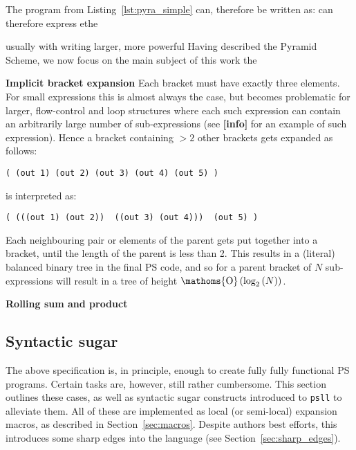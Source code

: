 \documentclass[aip,jcp,reprint,footinbib]{revtex4-1}
\DeclareMathOperator{\bigO}{\ensuremath{\mathoms{O}}}
\newcommand\plinfo{{\color[rgb]{0.929,0.694,0.125}\textbf{[info]}}\xspace}
\newcommand\psll{\texttt{psll}\xspace}
\begin{document}
The program from Listing~\ref{lst:pyra_simple} can, therefore be written as:
can therefore express ethe 

usually with writing larger, more powerful
Having described the Pyramid Scheme, we now focus on the main subject of this work the 




\textbf{Implicit bracket expansion} Each bracket must have exactly three elements. For small expressions this is almost always the case, but becomes problematic for larger, flow-control and loop structures where each such expression can contain an arbitrarily large number of sub-expressions (see \plinfo for an example of such expression). Hence a bracket containing $>2$ other brackets gets expanded as follows:
\begin{lstlisting}[language=psll,aboveskip=3pt,belowskip=-2pt,frame=none,numbers=none]
( (out 1) (out 2) (out 3) (out 4) (out 5) )
\end{lstlisting}
is interpreted as:
\begin{lstlisting}[language=psll,aboveskip=3pt,belowskip=-2pt,frame=none,numbers=none]
( (((out 1) (out 2))  ((out 3) (out 4)))  (out 5) )
\end{lstlisting}
Each neighbouring pair or elements of the parent gets put together into a bracket, until the length of the parent is less than 2. This results in a (literal) balanced binary tree in the final PS code, and so for a parent bracket of $N$ sub-expressions will result in a tree of height $\bigO\left(\log_2\left(N\right)\right)$.

\textbf{Rolling sum and product}





\subsection{Syntactic sugar}\label{sec:sugar}
The above specification is, in principle, enough to create fully fully functional PS programs. Certain tasks are, however, still rather cumbersome. This section outlines these cases, as well as syntactic sugar constructs introduced to \psll to alleviate them. All of these are implemented as local (or semi-local) expansion macros, as described in Section~\ref{sec:macros}. Despite authors best efforts, this introduces some sharp edges into the language (see Section~\ref{sec:sharp_edges}).
\end{document}
